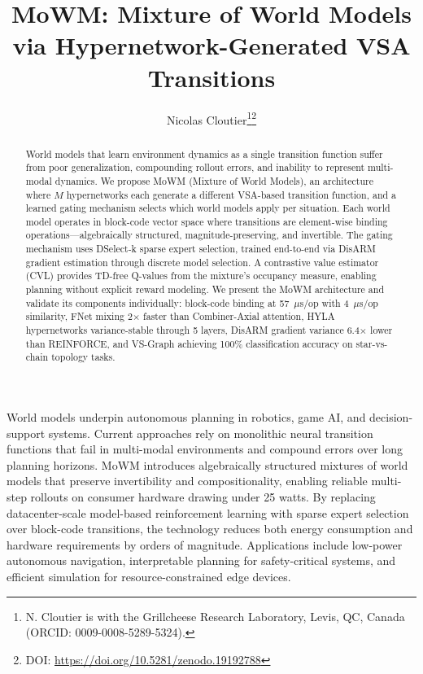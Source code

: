 \documentclass[journal]{IEEEtai}
\title{MoWM: Mixture of World Models via Hypernetwork-Generated VSA Transitions}
\author{Nicolas Cloutier\thanks{N. Cloutier is with the Grillcheese Research Laboratory, Levis, QC, Canada (ORCID: 0009-0008-5289-5324).}\thanks{DOI: \url{https://doi.org/10.5281/zenodo.19192788}}}
\begin{document}

\maketitle

\begin{abstract}
World models that learn environment dynamics as a single transition function suffer from poor generalization, compounding rollout errors, and inability to represent multi-modal dynamics. We propose MoWM (Mixture of World Models), an architecture where $M$ hypernetworks each generate a different VSA-based transition function, and a learned gating mechanism selects which world models apply per situation. Each world model operates in block-code vector space where transitions are element-wise binding operations---algebraically structured, magnitude-preserving, and invertible. The gating mechanism uses DSelect-k sparse expert selection, trained end-to-end via DisARM gradient estimation through discrete model selection. A contrastive value estimator (CVL) provides TD-free Q-values from the mixture's occupancy measure, enabling planning without explicit reward modeling. We present the MoWM architecture and validate its components individually: block-code binding at 57~$\mu$s/op with 4~$\mu$s/op similarity, FNet mixing 2$\times$ faster than Combiner-Axial attention, HYLA hypernetworks variance-stable through 5 layers, DisARM gradient variance 6.4$\times$ lower than REINFORCE, and VS-Graph achieving 100\% classification accuracy on star-vs-chain topology tasks.
\end{abstract}

\begin{IEEEImpStatement}
World models underpin autonomous planning in robotics, game AI, and decision-support systems. Current approaches rely on monolithic neural transition functions that fail in multi-modal environments and compound errors over long planning horizons. MoWM introduces algebraically structured mixtures of world models that preserve invertibility and compositionality, enabling reliable multi-step rollouts on consumer hardware drawing under 25 watts. By replacing datacenter-scale model-based reinforcement learning with sparse expert selection over block-code transitions, the technology reduces both energy consumption and hardware requirements by orders of magnitude. Applications include low-power autonomous navigation, interpretable planning for safety-critical systems, and efficient simulation for resource-constrained edge devices.
\end{IEEEImpStatement}
\end{document}
